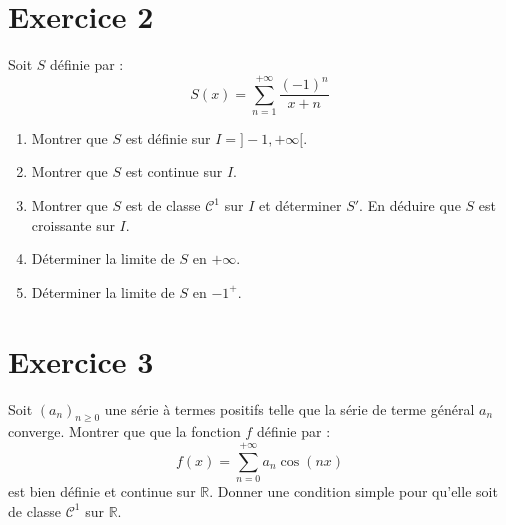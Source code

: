 \documentclass[a4paper,french,11pt,twoside]{VcCours}
\begin{document}
\section*{Exercice 2}   
   Soit $S$ définie par :
   $$ S(x) = \sum_{n=1}^{+ \infty} \dfrac{(-1)^n}{x+n}$$
   \begin{enumerate}
   \item Montrer que $S$ est définie sur $I= ]-1, + \infty[$.
   \item Montrer que $S$ est continue sur $I$.
   \item Montrer que $S$ est de classe $\mathcal{C}^1$ sur $I$ et déterminer $S'$. En déduire que $S$ est croissante sur $I$.
   \item Déterminer la limite de $S$ en $+ \infty$.
   \item Déterminer la limite de $S$ en $-1^+$.
   \end{enumerate}
   
\section*{Exercice 3}   
   Soit $(a_n)_{n \geq 0}$ une série à termes positifs telle que la série de terme général $a_n$ converge. Montrer que que la fonction $f$ définie par :
   $$ f(x) = \sum_{n=0}^{+ \infty} a_n \cos (nx)$$
   est bien définie et continue sur $\mathbb{R}$. Donner une condition simple pour qu'elle soit de classe $\mathcal{C}^1$ sur $\mathbb{R}$.
\end{document}
